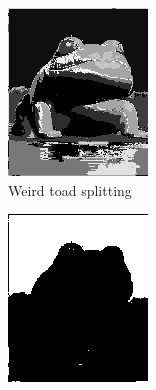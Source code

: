 \documentclass{article}
\begin{document}
\begin{figure}[htb]
  \centering
  \begin{subfigure}[b]{0.24\linewidth}
    \includegraphics[width=\linewidth]{images/toad_split.png}
    \caption{Weird toad splitting}
  \end{subfigure}
  \begin{subfigure}[b]{0.24\linewidth}
    \includegraphics[width=\linewidth]{images/toad_split_air.png}

\end{subfigure}
\end{figure}
\end{document}

